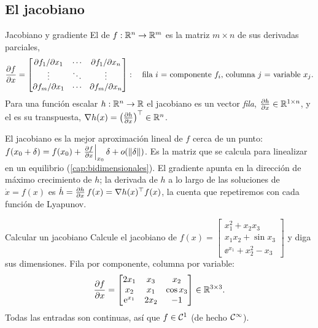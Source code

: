 \subsection{El jacobiano}

\begin{definicion}[label=def:pm-jacobiano]{Jacobiano y gradiente}
El  de $f:\mathbb{R}^n\to\mathbb{R}^m$ es la matriz $m\times n$ de sus derivadas parciales,
\[
  \frac{\partial f}{\partial x}=\begin{bmatrix}
    \partial f_1/\partial x_1 & \cdots & \partial f_1/\partial x_n\\
    \vdots & \ddots & \vdots\\
    \partial f_m/\partial x_1 & \cdots & \partial f_m/\partial x_n
  \end{bmatrix}:
  \quad\text{fila $i$ = componente $f_i$, columna $j$ = variable $x_j$.}
\]
Para una función escalar $h:\mathbb{R}^n\to\mathbb{R}$ el jacobiano es un vector \emph{fila}, $\frac{\partial h}{\partial x}\in\mathbb{R}^{1\times n}$, y el  es su transpuesta, $\nabla h(x)=\bigl(\frac{\partial h}{\partial x}\bigr)^{\top}\in\mathbb{R}^n$.
\end{definicion}

El jacobiano es la mejor aproximación lineal de $f$ cerca de un punto: $f(x_0+\delta)=f(x_0)+\left.\frac{\partial f}{\partial x}\right|_{x_0}\delta+o(\left\lVert \delta\right\rVert)$. Es la matriz que se calcula para linealizar en un equilibrio (\cref{cap:bidimensionales}). El gradiente apunta en la dirección de máximo crecimiento de $h$; la derivada de $h$ a lo largo de las soluciones de $\dot x=f(x)$ es $\dot h=\frac{\partial h}{\partial x}\,f(x)=\nabla h(x)^{\top} f(x)$, la cuenta que repetiremos con cada función de Lyapunov.

\begin{ejemplo}[label=ej:pm-jacobiano]{Calcular un jacobiano}
Calcule el jacobiano de $f(x)=\begin{bmatrix}x_1^2+x_2x_3\\ x_1x_2+\sin x_3\\ \ee^{x_1}+x_2^2-x_3\end{bmatrix}$ y diga sus dimensiones.
\solucion Fila por componente, columna por variable:
\[
  \frac{\partial f}{\partial x}=\begin{bmatrix}2x_1&x_3&x_2\\ x_2&x_1&\cos x_3\\ \mathrm{e}^{x_1}&2x_2&-1\end{bmatrix}\in\mathbb{R}^{3\times3} .
\]
Todas las entradas son continuas, así que $f\in\mathcal{C}^{1}$ (de hecho $\mathcal{C}^{\infty}$).
\end{ejemplo}

